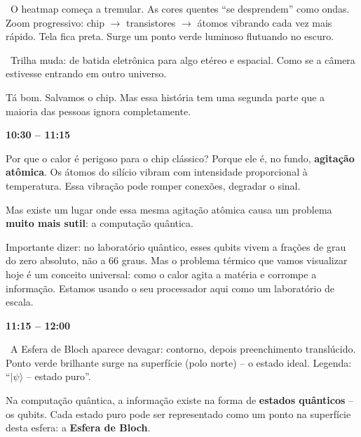 \documentclass[12pt, a4paper]{article}
\newcommand{\tempo}[1]{%
  \noindent\hfill
  {\small\sffamily\color{corTempo}%
   \faStopwatch\enspace\textbf{#1}}%
  \par\vspace{2pt}%
}
\begin{document}
\begin{visual}
\faFilm\ O heatmap começa a tremular. As cores quentes ``se desprendem'' como ondas.
Zoom progressivo: chip $\to$ transistores $\to$ átomos vibrando cada vez mais rápido.
Tela fica preta. Surge um ponto verde luminoso flutuando no escuro.
\end{visual}

\begin{audiocue}
\faMusic\ Trilha muda: de batida eletrônica para algo etéreo e espacial.
Como se a câmera estivesse entrando em outro universo.
\end{audiocue}

\begin{fala}
Tá bom. Salvamos o chip. Mas essa história tem uma segunda parte
que a maioria das pessoas ignora completamente.
\end{fala}

\tempo{10:30 -- 11:15}

\begin{fala}
Por que o calor é perigoso para o chip clássico? Porque ele é, no fundo,
\textbf{agitação atômica}. Os átomos do silício vibram com intensidade
proporcional à temperatura. Essa vibração pode romper conexões, degradar o sinal.
\end{fala}

\begin{fala}
Mas existe um lugar onde essa mesma agitação atômica causa um problema
\textbf{muito mais sutil}: a computação quântica.
\end{fala}

\begin{fala}
Importante dizer: no laboratório quântico, esses qubits vivem a frações de 
grau do zero absoluto, não a 66 graus. Mas o problema térmico que vamos 
visualizar hoje é um conceito universal: como o calor agita a matéria e 
corrompe a informação. Estamos usando o seu processador aqui como um 
laboratório de escala.
\end{fala}

\tempo{11:15 -- 12:00}

\begin{visual}
\faFilm\ A Esfera de Bloch aparece devagar: contorno, depois preenchimento translúcido.
Ponto verde brilhante surge na superfície (polo norte) -- o estado ideal.
Legenda: ``$|\psi\rangle$ -- estado puro''.
\end{visual}

\begin{fala}
Na computação quântica, a informação existe na forma de \textbf{estados quânticos}
-- os qubits. Cada estado puro pode ser representado como um ponto na
superfície desta esfera: a \textbf{Esfera de Bloch}.
\end{fala}
\end{document}
